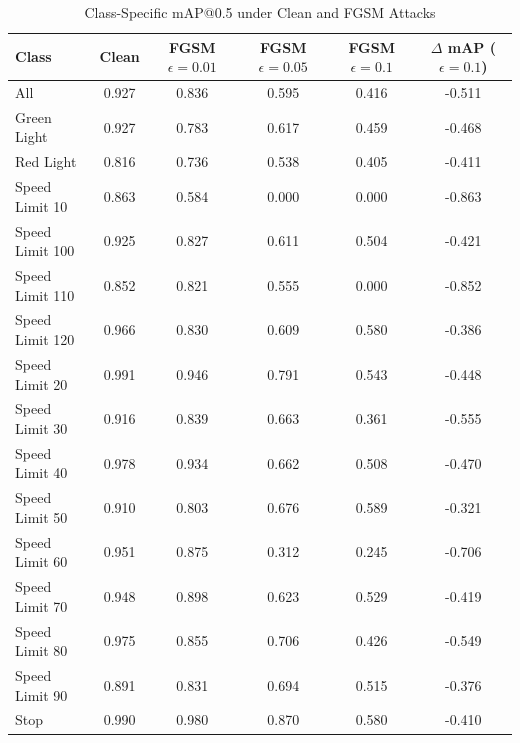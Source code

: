 \documentclass[../main.tex]{subfiles}
\begin{document}
\begin{table}[H]
\caption{Class-Specific mAP@0.5 under Clean and FGSM Attacks}
    \label{tab:yolo_fgsm_class_results}
    \centering
    \footnotesize
    \begin{tabular}{@{\hspace{0.3cm}}lS[table-format=1.3]S[table-format=1.3]S[table-format=1.3]S[table-format=1.3]S[table-format=-1.3]@{\hspace{0.3cm}}}
        \toprule
        \textbf{Class} & {\textbf{Clean}} & {\textbf{FGSM $\epsilon=0.01$}} & {\textbf{FGSM $\epsilon=0.05$}} & {\textbf{FGSM $\epsilon=0.1$}} & {\textbf{$\Delta$ mAP ($\epsilon=0.1$)}} \\
        \midrule
        All            & 0.927 & 0.836 & 0.595 & 0.416 & -0.511 \\
        Green Light    & 0.927 & 0.783 & 0.617 & 0.459 & -0.468 \\
        Red Light      & 0.816 & 0.736 & 0.538 & 0.405 & -0.411 \\
        Speed Limit 10 & 0.863 & 0.584 & 0.000 & 0.000 & -0.863 \\
        Speed Limit 100 & 0.925 & 0.827 & 0.611 & 0.504 & -0.421 \\
        Speed Limit 110 & 0.852 & 0.821 & 0.555 & 0.000 & -0.852 \\
        Speed Limit 120 & 0.966 & 0.830 & 0.609 & 0.580 & -0.386 \\
        Speed Limit 20 & 0.991 & 0.946 & 0.791 & 0.543 & -0.448 \\
        Speed Limit 30 & 0.916 & 0.839 & 0.663 & 0.361 & -0.555 \\
        Speed Limit 40 & 0.978 & 0.934 & 0.662 & 0.508 & -0.470 \\
        Speed Limit 50 & 0.910 & 0.803 & 0.676 & 0.589 & -0.321 \\
        Speed Limit 60 & 0.951 & 0.875 & 0.312 & 0.245 & -0.706 \\
        Speed Limit 70 & 0.948 & 0.898 & 0.623 & 0.529 & -0.419 \\
        Speed Limit 80 & 0.975 & 0.855 & 0.706 & 0.426 & -0.549 \\
        Speed Limit 90 & 0.891 & 0.831 & 0.694 & 0.515 & -0.376 \\
        Stop           & 0.990 & 0.980 & 0.870 & 0.580 & -0.410 \\
        \bottomrule
    \end{tabular}
\end{table}
\end{document}
